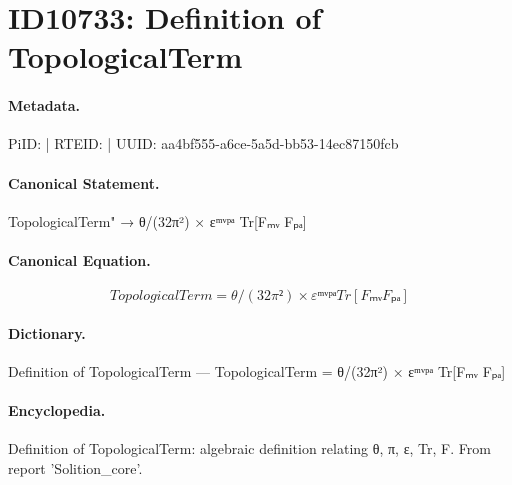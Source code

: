 \section*{ID10733: Definition of TopologicalTerm}
\paragraph{Metadata.}
PiID:  | RTEID:  | UUID: aa4bf555-a6ce-5a5d-bb53-14ec87150fcb

\paragraph{Canonical Statement.}
TopologicalTerm" → θ/(32π²) × εᵐᵛᵖᵃ Tr[Fₘᵥ Fₚₐ]

\paragraph{Canonical Equation.}
\[
TopologicalTerm = θ/(32π²) × εᵐᵛᵖᵃ Tr[Fₘᵥ Fₚₐ]
\]

\paragraph{Dictionary.}
Definition of TopologicalTerm — TopologicalTerm = θ/(32π²) × εᵐᵛᵖᵃ Tr[Fₘᵥ Fₚₐ]

\paragraph{Encyclopedia.}
Definition of TopologicalTerm: algebraic definition relating θ, π, ε, Tr, F. From report 'Solition\_core'.
